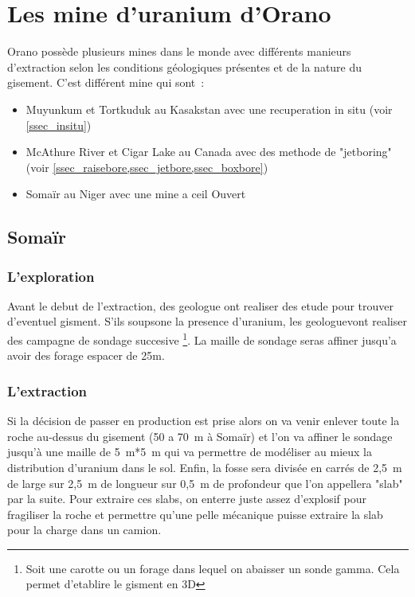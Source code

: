 \section{Les mine d'uranium d'Orano}
Orano possède plusieurs mines dans le monde avec différents manieurs d'extraction selon les conditions géologiques présentes et de la nature du gisement. C'est différent mine qui sont~:
\begin{itemize}
    \item Muyunkum et Tortkuduk au Kasakstan avec une recuperation in situ (voir \cref{ssec_insitu})
    \item McAthure River et Cigar Lake au Canada avec des methode de "jetboring" (voir \cref{ssec_raisebore,ssec_jetbore,ssec_boxbore})
    \item Somaïr au Niger avec une mine a ceil Ouvert
\end{itemize}

\subsection{Somaïr}
\subsubsection{L'exploration}
\par Avant le debut de l'extraction, des geologue ont realiser des etude pour trouver d'eventuel gisment. S'ils soupsone la presence d'uranium, les geologuevont realiser des campagne de sondage succesive \footnote{Soit une carotte ou un forage dans lequel on abaisser un 
sonde gamma. Cela permet d'etablire le gisment en 3D}. La maille de sondage seras affiner jusqu'a avoir des forage espacer de 25m. 
\subsubsection{L'extraction}
Si la décision de passer en production est prise alors on va venir enlever toute la roche au-dessus du gisement (50 a 70~m à Somaïr) et l’on va affiner le sondage jusqu'à une maille de 5~m*5~m qui va permettre de modéliser au mieux la distribution d'uranium dans le sol. Enfin, la fosse sera divisée en carrés de 2,5~m de large sur 2,5~m de longueur sur 0,5~m de profondeur que l'on appellera "slab" par la suite. Pour extraire ces slabs, on enterre juste assez d'explosif pour fragiliser la roche et permettre qu'une pelle mécanique puisse extraire la slab pour la charge dans un camion.

